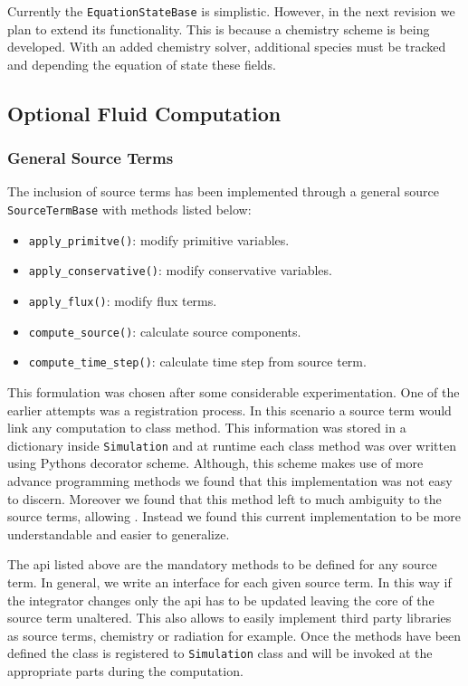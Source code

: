 Currently the \lstinline{EquationStateBase} is simplistic. However, in the next revision we plan
to extend its functionality. This is because a chemistry scheme is being developed. With an
added chemistry solver, additional species must be tracked and depending the equation of state
these fields.

\subsection{Optional Fluid Computation}
\subsubsection{General Source Terms}
The inclusion of source terms has been implemented through a general source
\lstinline{SourceTermBase} with methods listed below:
\begin{itemize}
    \item \lstinline{apply_primitve()}: modify primitive variables.
    \item \lstinline{apply_conservative()}: modify conservative variables.
    \item \lstinline{apply_flux()}: modify flux terms.
    \item \lstinline{compute_source()}: calculate source components.
    \item \lstinline{compute_time_step()}: calculate time step from source term.
\end{itemize}
This formulation was chosen after some considerable experimentation. One of the
earlier attempts was a registration process. In this scenario a source term
would link any computation to class method. This information was stored
in a dictionary inside \lstinline{Simulation} and at runtime each class method
was over written using Pythons decorator scheme. Although, this scheme makes
use of more advance programming methods we found that this implementation was
not easy to discern. Moreover we found that this method left to much ambiguity
to the source terms, allowing . Instead we
found this current implementation to be more understandable and easier to
generalize.

The api listed above are the mandatory methods to be defined for any source
term. In general, we write an interface for each given source term. In this
way if the integrator changes only the api has to be updated leaving
the core of the source term unaltered. This also allows to easily implement
third party libraries as source terms, chemistry or radiation for example.
Once the methods have been defined the class is registered to 
\lstinline{Simulation} class and will be invoked at the appropriate parts
during the computation.

